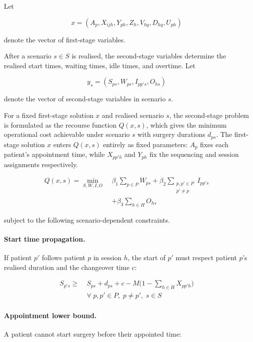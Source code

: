 Let

\[
x = (A_p, X_{ijh}, Y_{ph}, Z_h, V_{hq}, D_{hq}, U_{ph})
\]

denote the vector of first-stage variables.

After a scenario $s \in S$ is realised, the second-stage variables determine
the realised start times, waiting times, idle times, and overtime. Let

\[
y_s = (S_{ps}, W_{ps}, I_{pp's}, O_{hs})
\]

denote the vector of second-stage variables in scenario $s$.

For a fixed first-stage solution $x$ and realised scenario $s$, the second-stage
problem is formulated as the recourse function $Q(x,s)$, which gives the minimum
operational cost achievable under scenario $s$ with surgery durations $d_{ps}$.
The first-stage solution $x$ enters $Q(x,s)$ entirely as fixed parameters:
$A_p$ fixes each patient's appointment time, while $X_{pp'h}$ and $Y_{ph}$
fix the sequencing and session assignments respectively.

\begin{align}
  Q(x, s) = \min_{S,W,I,O} \;
    & \beta_1 \sum_{p \in P} W_{ps}
    + \beta_2 \!\!\sum_{\substack{p,p' \in P \\ p' \neq p}}\!\! I_{pp's} \nonumber \\
    &+ \beta_3 \sum_{h \in H} O_{hs}
  \label{eq:recourse_obj}
\end{align}

\noindent subject to the following scenario-dependent constraints.

\paragraph{Start time propagation.}
If patient $p'$ follows patient $p$ in session $h$, the start of $p'$ must
respect patient $p$'s realised duration and the changeover time $c$:

\begin{align}
  S_{p's} \geq\; & S_{ps} + d_{ps} + c - M\bigl(1 - \sum_{h \in H} X_{pp'h}\bigr)
  \nonumber \\
                 & \forall\; p, p' \in P,\; p \neq p',\; s \in S
  \label{eq:rc_seq}
\end{align}

\paragraph{Appointment lower bound.}
A patient cannot start surgery before their appointed time:

